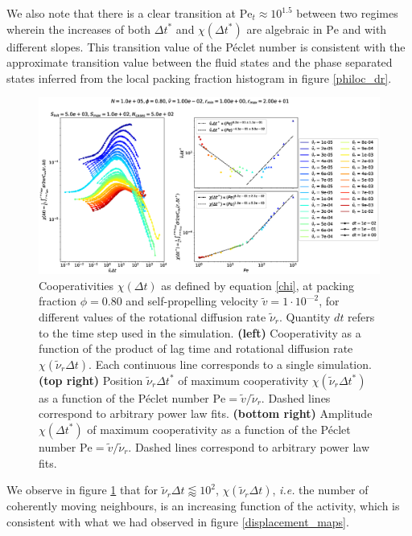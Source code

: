 \documentclass[class=report, float=false, crop=false]{standalone}
\begin{document}
We also note that there is a clear transition at $\text{Pe}_t \approx 10^{1.5}$ between two regimes wherein the increases of both $\Delta t^*$ and $\chi(\Delta t^*)$ are algebraic in $\text{Pe}$ and with different slopes. This transition value of the P\'eclet number is consistent with the approximate transition value between the fluid states and the phase separated states inferred from the local packing fraction histogram in figure \ref{philoc_dr}.\\

\begin{figure}[h!]
\centering
\includegraphics[width=\textwidth]{figures/figs/intCuu_Dk8000_Vj1000_Nq1000_Io5000_Mn1000_Cn5000_RMINl1000_RMAXm2000.eps}
\caption{Cooperativities $\chi(\Delta t)$ as defined by equation \ref{chi}, at packing fraction $\phi = 0.80$ and self-propelling velocity $\tilde{v} = 1\cdot10^{—2}$, for different values of the rotational diffusion rate $\tilde{\nu}_r$. Quantity $dt$ refers to the time step used in the simulation. \textbf{(left)} Cooperativity as a function of the product of lag time and rotational diffusion rate $\chi(\tilde{\nu}_r \Delta t)$. Each continuous line corresponds to a single simulation. \textbf{(top right)} Position $\tilde{\nu}_r \Delta t^*$ of maximum cooperativity $\chi(\tilde{\nu}_r \Delta t^*)$ as a function of the P\'eclet number $\text{Pe} = \tilde{v}/\tilde{\nu}_r$. Dashed lines correspond to arbitrary power law fits. \textbf{(bottom right)} Amplitude $\chi(\Delta t^*)$ of maximum cooperativity as a function of the P\'eclet number $\text{Pe} = \tilde{v}/\tilde{\nu}_r$. Dashed lines correspond to arbitrary power law fits.}
\label{chi_dr}
\end{figure}

We observe in figure \ref{chi_dr} that for $\tilde{\nu}_r \Delta t \lessapprox 10^2$, $\chi(\tilde{\nu}_r \Delta t)$, \textit{i.e.} the number of coherently moving neighbours, is an increasing function of the activity, which is consistent with what we had observed in figure \ref{displacement_maps}.\\
\end{document}
